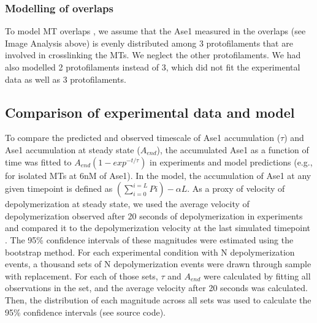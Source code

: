 \subsubsection{Modelling of overlaps}
To model MT overlaps , we assume that the Ase1 measured in the overlaps (see Image Analysis above) is evenly distributed among 3 protofilaments that are involved in crosslinking the MTs. We neglect the other protofilaments. We had also modelled 2 protofilaments instead of 3, which did not fit the experimental data as well as 3 protofilaments.

\subsection{Comparison of experimental data and model}
To compare the predicted and observed timescale of Ase1 accumulation ($\tau$) and Ase1 accumulation at steady state ($A_{end}$), the accumulated Ase1 as a function of time was fitted to $A_{end} (1-exp^{-t/\tau})$ in experiments and model predictions (e.g.,  for isolated MTs at 6nM of Ase1). In the model, the accumulation of Ase1 at any given timepoint is defined as $(\sum_{i=0}^{i=L}Pi)-\alpha L$. As a proxy of velocity of depolymerization at steady state, we used the average velocity of depolymerization observed after 20 seconds of depolymerization in experiments and compared it to the depolymerization velocity at the last simulated timepoint . The 95\% confidence intervals of these magnitudes were estimated using the bootstrap method. For each experimental condition with N depolymerization events, a thousand sets of N depolymerization events were drawn through sample with replacement. For each of those sets, $\tau$ and $A_{end}$ were calculated by fitting all observations in the set, and the average velocity after 20 seconds was calculated. Then, the distribution of each magnitude across all sets was used to calculate the 95\% confidence intervals (see source code).
